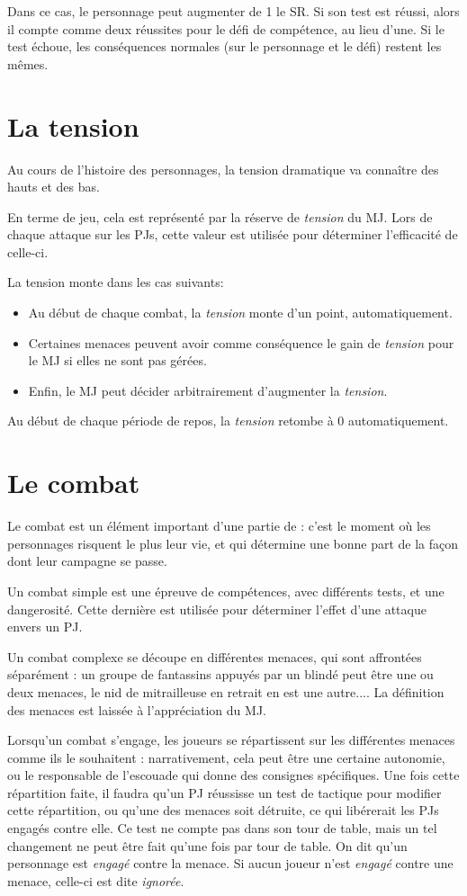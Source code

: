 \documentclass{report}
\begin{document}
\begin{multicols}{2}
Dans ce cas, le personnage peut augmenter de 1 le SR. Si son test est réussi, alors il compte comme deux réussites pour le défi de compétence, au lieu d'une. Si le test échoue, les conséquences normales (sur le personnage et le défi) restent les mêmes.

\section{La tension}
Au cours de l'histoire des personnages, la tension dramatique va connaître des hauts et des bas.

En terme de jeu, cela est représenté par la réserve de \emph{tension} du MJ. Lors de chaque attaque sur les PJs, cette valeur est utilisée pour déterminer l'efficacité de celle-ci.

La tension monte dans les cas suivants:
\begin{itemize}
    \item Au début de chaque combat, la \emph{tension} monte d'un point, automatiquement.
    \item Certaines menaces peuvent avoir comme conséquence le gain de \emph{tension} pour le MJ si elles ne sont pas gérées.
    \item Enfin, le MJ peut décider arbitrairement d'augmenter la \emph{tension}. %
\end{itemize}
Au début de chaque période de repos, la \emph{tension} retombe à 0 automatiquement.
\section{Le combat}
Le combat est un élément important d'une partie de \diminutif : c'est le moment où les personnages risquent le plus leur vie, et qui détermine une bonne part de la façon dont leur campagne se passe.

Un combat simple est une épreuve de compétences, avec différents tests, et une dangerosité. Cette dernière est utilisée pour déterminer l'effet d'une attaque envers un PJ.

Un combat complexe se découpe en différentes menaces, qui sont affrontées séparément : un groupe de fantassins appuyés par un blindé peut être une ou deux menaces, le nid de mitrailleuse en retrait en est une autre.... La définition des menaces est laissée à l'appréciation du MJ.

Lorsqu'un combat s'engage, les joueurs se répartissent sur les différentes menaces comme ils le souhaitent : narrativement, cela peut être une certaine autonomie, ou le responsable de l'escouade qui donne des consignes spécifiques. Une fois cette répartition faite, il faudra qu'un PJ réussisse un test de tactique pour modifier cette répartition, ou qu'une des menaces soit détruite, ce qui libérerait les PJs engagés contre elle. Ce test ne compte pas dans son tour de table, mais un tel changement ne peut être fait qu'une fois par tour de table. On dit qu'un personnage est \emph{engagé} contre la menace. Si aucun joueur n'est \emph{engagé} contre une menace, celle-ci est dite \emph{ignorée}.

\end{multicols}
\end{document}
